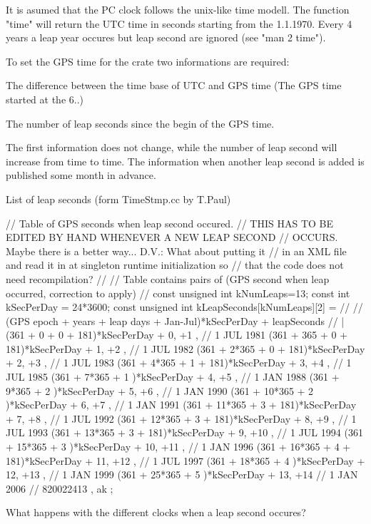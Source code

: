 \begin{DoxyVerb}  It is asumed that the PC clock follows
  the unix-like time modell. The function "time"
  will return the UTC time in seconds starting from
  the 1.1.1970. Every 4 years a leap year
  occures but leap second are ignored (see "man 2 time").

  To set the GPS time for the crate two informations are
  required:
\end{DoxyVerb}
 \begin{DoxyItemize}
\item The difference between the time base of U\-T\-C and G\-P\-S time (The G\-P\-S time started at the 6..) \item The number of leap seconds since the begin of the G\-P\-S time.\end{DoxyItemize}
The first information does not change, while the number of leap second will increase from time to time. The information when another leap second is added is published some month in advance.

List of leap seconds (form Time\-Stmp.\-cc by T.\-Paul) \begin{DoxyVerb}// Table of GPS seconds when leap second occured.
// THIS HAS TO BE EDITED BY HAND WHENEVER A NEW LEAP SECOND
// OCCURS.  Maybe there is a better way... D.V.: What about putting it
// in an XML file and read it in at singleton runtime initialization so
// that the code does not need recompilation?
//
// Table contains pairs of (GPS second when leap occurred, correction to apply)
//
const unsigned int kNumLeaps=13;
const int kSecPerDay = 24*3600;
const unsigned int kLeapSeconds[kNumLeaps][2] = {
  //
  // (GPS epoch + years + leap days + Jan-Jul)*kSecPerDay + leapSeconds
  //                                           |
  { (361 +       0 +   0 + 181)*kSecPerDay +  0, +1  },    // 1 JUL 1981
  { (361 +     365 +   0 + 181)*kSecPerDay +  1, +2  },    // 1 JUL 1982
  { (361 +   2*365 +   0 + 181)*kSecPerDay +  2, +3  },    // 1 JUL 1983
  { (361 +   4*365 +   1 + 181)*kSecPerDay +  3, +4  },    // 1 JUL 1985
  { (361 +   7*365 +   1      )*kSecPerDay +  4, +5  },    // 1 JAN 1988
  { (361 +   9*365 +   2      )*kSecPerDay +  5, +6  },    // 1 JAN 1990
  { (361 +  10*365 +   2      )*kSecPerDay +  6, +7  },    // 1 JAN 1991
  { (361 +  11*365 +   3 + 181)*kSecPerDay +  7, +8  },    // 1 JUL 1992
  { (361 +  12*365 +   3 + 181)*kSecPerDay +  8, +9  },    // 1 JUL 1993
  { (361 +  13*365 +   3 + 181)*kSecPerDay +  9, +10 },    // 1 JUL 1994
  { (361 +  15*365 +   3      )*kSecPerDay + 10, +11 },    // 1 JAN 1996
  { (361 +  16*365 +   4 + 181)*kSecPerDay + 11, +12 },    // 1 JUL 1997
  { (361 +  18*365 +   4      )*kSecPerDay + 12, +13 },    // 1 JAN 1999
  { (361 +  25*365 +   5      )*kSecPerDay + 13, +14 }     // 1 JAN 2006 // 820022413 , ak
};\end{DoxyVerb}
 \begin{DoxyVerb}What happens with the different clocks when a leap
second occures?
\end{DoxyVerb}


